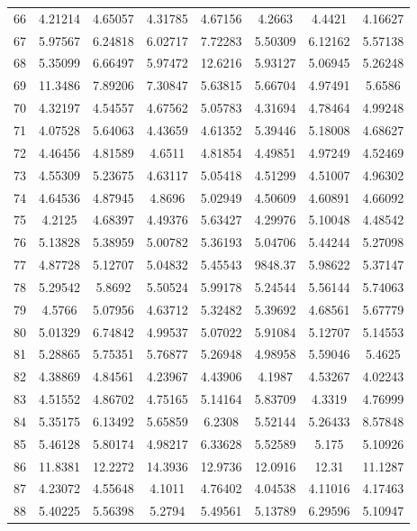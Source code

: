 \begin{figure}
\begin{tabular}{cccccccc}
66 & 4.21214 & 4.65057 & 4.31785 & 4.67156 & 4.2663 & 4.4421 & 4.16627\\
67 & 5.97567 & 6.24818 & 6.02717 & 7.72283 & 5.50309 & 6.12162 & 5.57138\\
68 & 5.35099 & 6.66497 & 5.97472 & 12.6216 & 5.93127 & 5.06945 & 5.26248\\
69 & 11.3486 & 7.89206 & 7.30847 & 5.63815 & 5.66704 & 4.97491 & 5.6586\\
70 & 4.32197 & 4.54557 & 4.67562 & 5.05783 & 4.31694 & 4.78464 & 4.99248\\
71 & 4.07528 & 5.64063 & 4.43659 & 4.61352 & 5.39446 & 5.18008 & 4.68627\\
72 & 4.46456 & 4.81589 & 4.6511 & 4.81854 & 4.49851 & 4.97249 & 4.52469\\
73 & 4.55309 & 5.23675 & 4.63117 & 5.05418 & 4.51299 & 4.51007 & 4.96302\\
74 & 4.64536 & 4.87945 & 4.8696 & 5.02949 & 4.50609 & 4.60891 & 4.66092\\
75 & 4.2125 & 4.68397 & 4.49376 & 5.63427 & 4.29976 & 5.10048 & 4.48542\\
76 & 5.13828 & 5.38959 & 5.00782 & 5.36193 & 5.04706 & 5.44244 & 5.27098\\
77 & 4.87728 & 5.12707 & 5.04832 & 5.45543 & 9848.37 & 5.98622 & 5.37147\\
78 & 5.29542 & 5.8692 & 5.50524 & 5.99178 & 5.24544 & 5.56144 & 5.74063\\
79 & 4.5766 & 5.07956 & 4.63712 & 5.32482 & 5.39692 & 4.68561 & 5.67779\\
80 & 5.01329 & 6.74842 & 4.99537 & 5.07022 & 5.91084 & 5.12707 & 5.14553\\
81 & 5.28865 & 5.75351 & 5.76877 & 5.26948 & 4.98958 & 5.59046 & 5.4625\\
82 & 4.38869 & 4.84561 & 4.23967 & 4.43906 & 4.1987 & 4.53267 & 4.02243\\
83 & 4.51552 & 4.86702 & 4.75165 & 5.14164 & 5.83709 & 4.3319 & 4.76999\\
84 & 5.35175 & 6.13492 & 5.65859 & 6.2308 & 5.52144 & 5.26433 & 8.57848\\
85 & 5.46128 & 5.80174 & 4.98217 & 6.33628 & 5.52589 & 5.175 & 5.10926\\
86 & 11.8381 & 12.2272 & 14.3936 & 12.9736 & 12.0916 & 12.31 & 11.1287\\
87 & 4.23072 & 4.55648 & 4.1011 & 4.76402 & 4.04538 & 4.11016 & 4.17463\\
88 & 5.40225 & 5.56398 & 5.2794 & 5.49561 & 5.13789 & 6.29596 & 5.10947\\

\end{tabular}
\end{figure}
